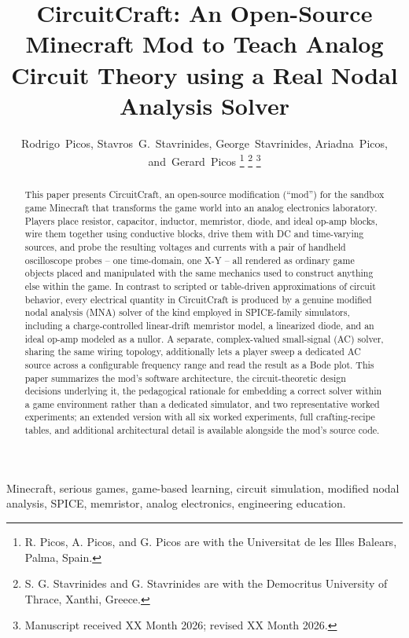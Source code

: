 \documentclass[journal]{IEEEtran}
\title{CircuitCraft: An Open-Source Minecraft Mod to Teach Analog Circuit Theory using a Real Nodal Analysis Solver}
\author{Rodrigo~Picos, Stavros~G.~Stavrinides, George~Stavrinides, Ariadna~Picos, and~Gerard~Picos%
\thanks{R. Picos, A. Picos, and G. Picos are with the Universitat de les Illes Balears, Palma, Spain.}%
\thanks{S. G. Stavrinides and G. Stavrinides are with the Democritus University of Thrace, Xanthi, Greece.}%
\thanks{Manuscript received XX Month 2026; revised XX Month 2026.}}
\begin{document}
\maketitle

\begin{abstract}
This paper presents CircuitCraft, an open-source modification (``mod'') for the sandbox
game Minecraft that transforms the game world into an analog electronics laboratory. Players
place resistor, capacitor, inductor, memristor, diode, and ideal op-amp blocks, wire them
together using conductive blocks, drive them with DC and time-varying sources, and probe the
resulting voltages and currents with a pair of handheld oscilloscope probes -- one
time-domain, one X-Y -- all rendered as ordinary game objects placed and manipulated with the
same mechanics used to construct anything else within the game. In contrast to scripted or
table-driven approximations of circuit behavior, every electrical quantity in CircuitCraft
is produced by a genuine modified nodal analysis (MNA) solver of the kind
employed in SPICE-family simulators, including a charge-controlled linear-drift memristor
model, a linearized diode, and an ideal op-amp modeled as a nullor. A separate, complex-valued
small-signal (AC) solver, sharing the same wiring topology, additionally lets a player sweep a
dedicated AC source across a configurable frequency range and read the result as a Bode plot.
This paper summarizes the mod's software architecture, the circuit-theoretic design decisions
underlying it, the pedagogical rationale for embedding a correct solver within a game
environment rather than a dedicated simulator, and two representative worked experiments; an
extended version with all six worked experiments, full crafting-recipe tables, and additional
architectural detail is available alongside the mod's source code.
\end{abstract}

\begin{IEEEkeywords}
Minecraft, serious games, game-based learning, circuit simulation, modified nodal analysis,
SPICE, memristor, analog electronics, engineering education.
\end{IEEEkeywords}

\IEEEpeerreviewmaketitle
















\end{document}
